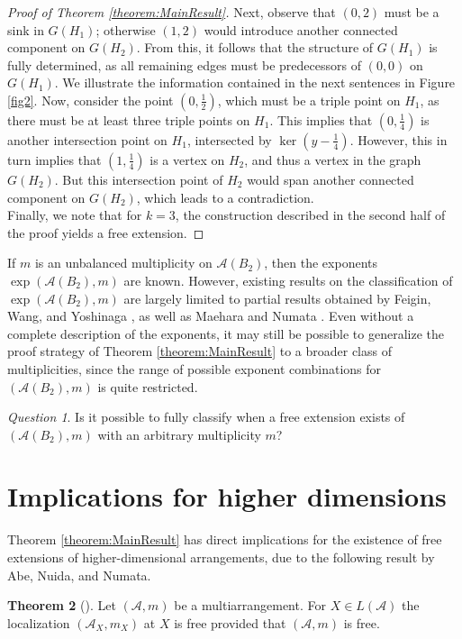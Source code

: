 \documentclass[12pt]{amsart}
\theoremstyle{definition}
\newtheorem{theorem}{Theorem}[section]
\theoremstyle{remark}
\newtheorem{question}[theorem]{Question}
\newcommand\CA{{\mathscr A}}
\begin{document}
\begin{proof}[Proof of Theorem \ref{theorem:MainResult}]
Next, observe that $(0,2)$ must be a sink in $G(H_1)$; otherwise $(1,2)$ would introduce another connected component on $G(H_2)$.
From this, it follows that the structure of $G(H_1)$ is fully determined, as all remaining edges must be predecessors of $(0,0)$ on $G(H_1)$. We illustrate the information contained in the next sentences in Figure \ref{fig2}. Now, consider the point $(0,\frac{1}{2})$, which must be a triple point on
$H_1$, as there must be at least three triple points on $H_1$. This implies that $(0,\frac{1}{4})$ is another intersection point on $H_1$, intersected by $\ker(y-\frac{1}{4})$. However, this in turn implies that $(1,\frac{1}{4})$ is a vertex on $H_2$, and thus a vertex in the graph $G(H_2)$. But this intersection point of $H_2$ would span another connected component on $G(H_2)$, which leads to a contradiction.\\
Finally, we note that for $k=3$, the construction described in the second half of the proof yields a free extension. 
\end{proof}
    
If $m$ is an unbalanced multiplicity on $\CA(B_2)$, then the exponents $\exp(\CA(B_2),m)$ are known. However, existing results on the classification of $\exp(\CA(B_2),m)$ are largely limited to partial results obtained by Feigin, Wang, and Yoshinaga \cite{2309.01287}, as well as Maehara and Numata \cite{2312.06356}. Even without a complete description of the exponents, it may still be possible to generalize the proof strategy of Theorem \ref{theorem:MainResult} to a broader class of multiplicities, since the range of possible exponent combinations for $(\CA(B_2),m)$ is quite restricted.  
\begin{question}
    Is it possible to fully classify when a free extension exists of $(\CA(B_2),m)$ with an arbitrary multiplicity $m$?
\end{question}

\section{Implications for higher dimensions}
Theorem \ref{theorem:MainResult} has direct implications for the existence of free extensions of higher-dimensional arrangements, due to the following result by Abe, Nuida, and Numata. 

\begin{theorem}[{\cite[Prop.~1.7]{abenuidanumata:signedeliminable}}]\label{theorem: Multilocalizations are free}
	Let $(\CA,m)$ be a multiarrangement. For $X\in L(\CA)$ the localization $(\CA_X,m_X)$ at $X$ is free provided that $(\CA,m)$ is free. 
\end{theorem}
\end{document}
